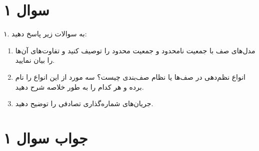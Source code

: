 \section*{سوال ۱}

۱. به سوالات زیر پاسخ دهید:

\begin{enumerate}
	\item مدل‌های صف با جمعیت نامحدود  و جمعیت محدود  را توصیف کنید و تفاوت‌های آن‌ها را بیان نمایید.
	\item انواع نظم‌دهی در صف‌ها یا نظام صف‌بندی  چیست؟ سه مورد از این انواع را نام برده و هر کدام را به طور خلاصه شرح دهید.
	\item جریان‌های شماره‌گذاری تصادفی  را توضیح دهید.
\end{enumerate}

\section*{جواب سوال ۱}

